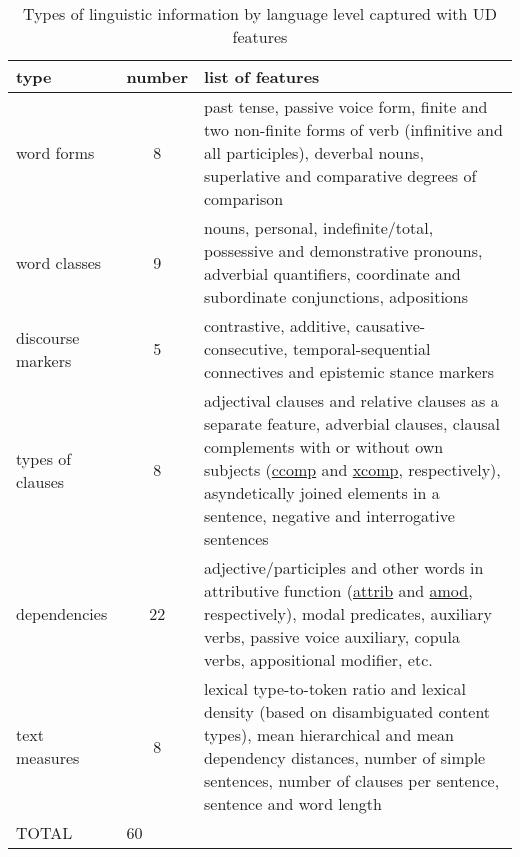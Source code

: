 \begin{table}[H]
	\centering
	\begin{tabular}{@{} l|c|p{9cm} @{}}%
		\toprule
		
		type & number & list of features \\
		\midrule
		word forms & 8 & past tense, passive voice form, finite and two non-finite forms of verb (infinitive and all participles), deverbal nouns, superlative and comparative degrees of comparison \\
		
		word classes & 9 & nouns, personal, indefinite/total, possessive and demonstrative pronouns, adverbial quantifiers, coordinate and subordinate conjunctions, adpositions \\
		
		discourse markers & 5 & contrastive, additive, causative-consecutive, temporal-sequential connectives and epistemic stance markers \\
		
		types of clauses & 8 & adjectival clauses and relative clauses as a separate feature, adverbial clauses, clausal complements with or without own subjects (\hyperlink{ft:ccomp}{ccomp} and \hyperlink{ft:xcomp}{xcomp}, respectively), asyndetically joined elements in a sentence, negative and interrogative sentences \\
		
		dependencies & 22 & adjective/participles and other words in attributive function (\hyperlink{ft:attrib}{attrib} and \hyperlink{ft:amod}{amod}, respectively), modal predicates, auxiliary verbs, passive voice auxiliary, copula verbs, appositional modifier, etc.\\
		
		text measures & 8 & lexical type-to-token ratio and lexical density (based on disambiguated content types), mean hierarchical and mean dependency distances, number of simple sentences, number of clauses per sentence, sentence and word length \\
		
		TOTAL & \multicolumn{2}{l}{\hspace{1em}60} \\
		\bottomrule
	\end{tabular} 
	\caption{\label{tab:feats} Types of linguistic information by language level captured with UD features}
\end{table}

